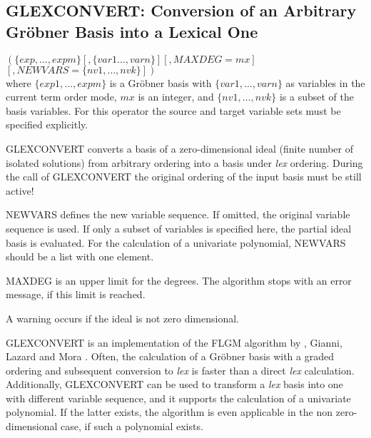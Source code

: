 \subsection{GLEXCONVERT: Conversion of an Arbitrary Gr\"obner Basis
into a Lexical One}
\begin{description}
\item[{\it GLEXCONVERT}] $ \left(\{exp,\ldots , expm\} \left[,\{var1
\ldots , varn\}\right]\left[,MAXDEG=mx\right]\right.$ \\
$\left.\left[,NEWVARS=\{nv1, \ldots , nvk\}\right]\right) $ \\
where $\{exp1, \ldots , expm\}$ is a Gr\"obner basis with
$\{var1, \ldots , varn\}$ as variables in the current term order mode,
$mx$ is an integer, and
$\{nv1, \ldots , nvk\}$ is a subset of the basis variables.
For this operator the source and target variable sets must be specified
explicitly.
\end{description}

GLEXCONVERT converts a basis of a zero-dimensional ideal (finite number
of isolated solutions) from arbitrary ordering into a basis under {\it
lex} ordering. During the call of GLEXCONVERT the original ordering of
the input basis must be still active!

NEWVARS defines the new variable sequence. If omitted, the
original variable sequence is used. If only a subset of variables is
specified here, the partial ideal basis is evaluated. For the
calculation of a univariate polynomial, NEW\-VARS should be a list
with one element.

MAXDEG is an upper limit for the degrees. The algorithm stops with
an error message, if this limit is reached.

A warning occurs if the ideal is not zero dimensional.

GLEXCONVERT is an implementation of the FLGM algorithm by
, {\sc Gianni}, {\sc Lazard} and {\sc
Mora} \cite{Faugere:89}. Often, the calculation of a Gr\"obner basis
with a graded ordering and subsequent conversion to {\it lex} is
faster than a direct {\it lex} calculation. Additionally, GLEXCONVERT
can be used to transform a {\it lex} basis into one with different
variable sequence, and it supports the calculation of a univariate
polynomial. If the latter exists, the algorithm is even applicable in
the non zero-dimensional case, if such a polynomial exists.

